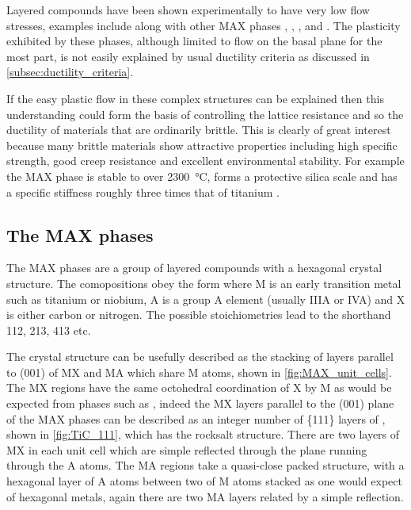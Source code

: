 
Layered compounds have been shown experimentally to have very low flow stresses, examples include  along with other MAX phases \cite{Barsoum2011},  \cite{Korte2012NbCo},  \cite{Telle2006},  and  \cite{Sygnatowicz2015}. The plasticity exhibited by these phases, although limited to flow on the basal plane for the most part, is not easily explained by usual ductility criteria as discussed in \autoref{subsec:ductility_criteria}. 

If the easy plastic flow in these complex structures can be explained then this understanding could form the basis of controlling the lattice resistance and so the ductility of materials that are ordinarily brittle. This is clearly of great interest because many brittle materials show attractive properties including high specific strength, good creep resistance and excellent environmental stability. For example the MAX phase  is stable to over \SI{2300}{\celsius}, forms a protective silica scale and has a specific stiffness roughly three times that of titanium \cite{Radovic2013}.

\subsection{The MAX phases}

The MAX phases are a group of layered compounds with a hexagonal crystal structure. The comopositions obey the form  where M is an early transition metal such as titanium or niobium, A is a group A element (usually IIIA or IVA) and X is either carbon or nitrogen. The possible stoichiometries lead to the shorthand 112, 213, 413 etc.

The crystal structure can be usefully described as the stacking of layers parallel to (001) of MX and MA which share M atoms,  shown in \autoref{fig:MAX_unit_cells}. The MX regions have the same octohedral coordination of X by M as would be expected from phases such as , indeed the MX layers parallel to the (001) plane of the MAX phases can be described as an integer number of \{111\} layers of , shown in \autoref{fig:TiC_111}, which has the rocksalt structure. There are two layers of MX in each unit cell which are simple reflected through the plane running through the A atoms. The MA regions take a quasi-close packed structure, with a hexagonal layer of A atoms between two of M atoms stacked as one would expect of hexagonal metals, again there are two MA layers related by a simple reflection.


